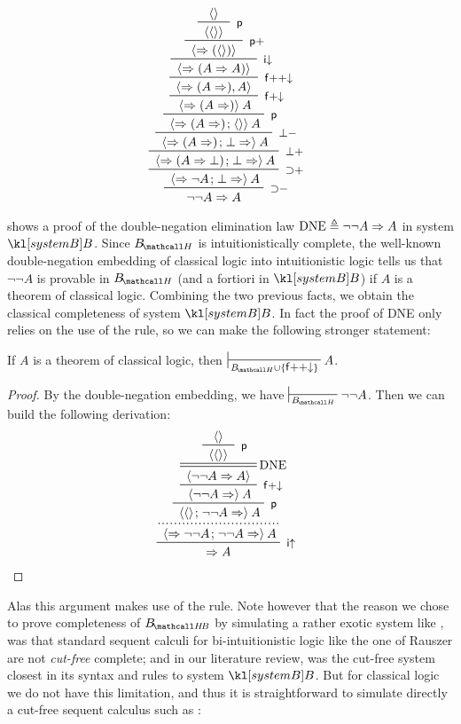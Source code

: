 \begin{marginfigure}
  $$
  \R[{\limp}{-}]
  {\R[{\limp}{+}]
  {\R[{\bot}{+}]
  {\R[{\bot}{-}]
  {\R[\rsf{p}]
  {\R[\rsf{f{+}{\da}}]
  {\R[\rsf{f{+}{+}{\da}}]
  {\R[\rsf{i{\da}}]
  {\R[\rsf{p}{+}]
  {\R[\rsf{p}]
  {{} \piq{}}
  {{} \piq{\piq{}}}}
  {{} \piq{\seq (\piq{})}}}
  {{} \piq{\seq (A \seq A)}}}
  {{} \piq{\seq (A \seq), A}}}
  {{} \piq{\seq (A \seq)} A}}
  {{} \piq{\seq (A \seq) \sep \piq{}} A}}
  {{} \piq{\seq (A \seq) \sep \bot \seq} A}}
  {{} \piq{\seq (A \seq \bot) \sep \bot \seq} A}}
  {{} \piq{\seq \neg A \sep \bot \seq} A}}
  {\neg \neg A \seq A}
  $$
  \caption{Proof of DNE in system $\sysB$}
\end{marginfigure}

 shows a proof of the double-negation elimination law
$\mathrm{DNE} \triangleq \neg \neg A \Rightarrow A$ in system $\sysB$. Since $\sysBH$ is
intuitionistically complete, the well-known double-negation embedding of
classical logic into intuitionistic logic tells us that $\neg \neg A$ is
provable in $\sysBH$ (and a fortiori in $\sysB$) if $A$ is a theorem of
classical logic. Combining the two previous facts, we obtain the classical
completeness of system $\sysB$. In fact the proof of DNE only relies on the use
of the  rule, so we can make the following stronger
statement:

\begin{corollary}\label{cor:bubbles-completeness-classical}
  If $A$ is a theorem of classical logic, then $\prov{\sysBH \cup
  \{\rsf{f{+}{+}{\da}}\}} A$.
\end{corollary}
\begin{proof}
  By the double-negation embedding, we have $\prov{\sysBH} \neg \neg A$. Then we
  can build the following derivation:
  $$
  \R[\rsf{i{\ua}}]
  {\prftree[dotted]
  {\R[\rsf{p}]
  {\R[\rsf{f{+}{\da}}]
  {\prftree[r][d]{DNE}  
  {\R[\rsf{p}]
  {{} \piq{}}
  {{} \piq{\piq{}}}}
  {{} \piq{\neg \neg A \seq A}}}
  {{} \piq{\neg \neg A \seq} A}}
  {{} \piq{\piq{} \sep \neg \neg A \seq} A}}
  {{} \piq{\seq \neg \neg A \sep \neg \neg A \seq} A}}
  {\seq A}
  $$
\end{proof}

Alas this argument makes use of the  rule. Note however that
the reason we chose to prove completeness of $\sysBHB$ by simulating a rather
exotic system like , was that standard sequent calculi for
bi-intuitionistic logic like the one of Rauszer
 are not \emph{cut-free} complete; and in
our literature review,  was the cut-free system closest in its
syntax and rules to system $\sysB$. But for classical logic we do not have this
limitation, and thus it is straightforward to simulate directly a cut-free
sequent calculus such as  :

